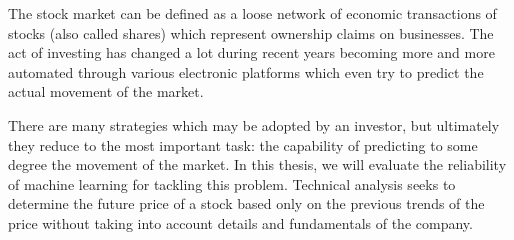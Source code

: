 The stock market can be defined as a loose network of economic transactions of stocks (also called shares) which represent ownership claims on businesses. The act of investing has changed a lot during recent years becoming more and more automated through various electronic platforms which even try to predict the actual movement of the market.

There are many strategies which may be adopted by an investor, but ultimately they reduce to the most important task: the capability of predicting to some degree the movement of the market. In this thesis, we will evaluate the reliability of machine learning for tackling this problem. Technical analysis seeks to determine the future price of a stock based only on the previous trends of the price without taking into account details and fundamentals of the company.